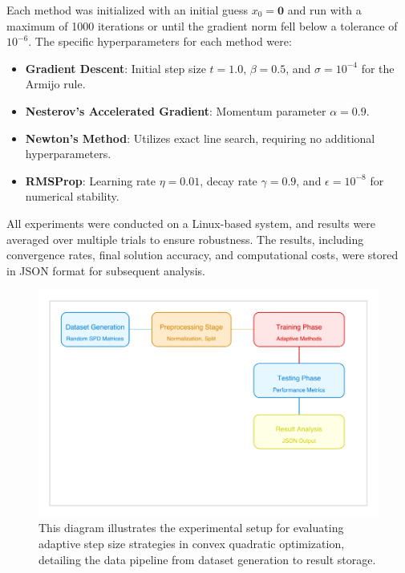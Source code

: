 \documentclass[11pt]{article}
\begin{document}
Each method was initialized with an initial guess $x_0 = \mathbf{0}$ and run with a maximum of 1000 iterations or until the gradient norm fell below a tolerance of $10^{-6}$. The specific hyperparameters for each method were:

\begin{itemize}

 \item \textbf{Gradient Descent}: Initial step size $t = 1.0$, $\beta = 0.5$, and $\sigma = 10^{-4}$ for the Armijo rule.
 \item \textbf{Nesterov's Accelerated Gradient}: Momentum parameter $\alpha = 0.9$.
 \item \textbf{Newton's Method}: Utilizes exact line search, requiring no additional hyperparameters.
 \item \textbf{RMSProp}: Learning rate $\eta = 0.01$, decay rate $\gamma = 0.9$, and $\epsilon = 10^{-8}$ for numerical stability.
\end{itemize}



All experiments were conducted on a Linux-based system, and results were averaged over multiple trials to ensure robustness. The results, including convergence rates, final solution accuracy, and computational costs, were stored in JSON format for subsequent analysis.

 \begin{figure}[!htbp]
 \centering
 \includegraphics[width=0.9\linewidth]{diagram_experimental_setup.pdf}
 \caption{This diagram illustrates the experimental setup for evaluating adaptive step size strategies in convex quadratic optimization, detailing the data pipeline from dataset generation to result storage.}
 \label{fig:experimental_setup}
 \end{figure}
\end{document}
